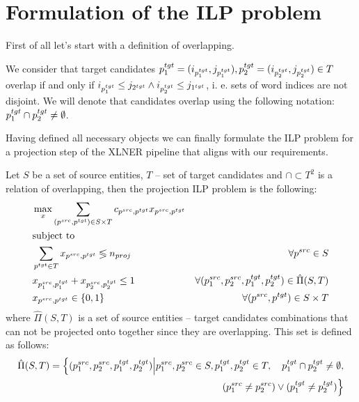 \section{Formulation of the ILP problem}
First of all let's start with a definition of overlapping.

\begin{definition} \label{def:overlapping}
    We consider that target candidates \linebreak
    \( p_1^{tgt} = (i_{p_1^{tgt}}, j_{p_1^{tgt}}), p_2^{tgt} = (i_{p_2^{tgt}}, j_{p_2^{tgt}}) \in T \) overlap if and only if
    \( i_{p_1^{tgt}} \leq j_{2^{tgt}} \land i_{p_2^{tgt}} \leq j_{1^{tgt}} \), i. e. sets of word indices are
    not disjoint. We will denote that candidates overlap using
    the following notation: \( p_1^{tgt} \cap p_2^{tgt} \neq \emptyset \).
\end{definition}

Having defined all necessary objects we can finally formulate the ILP problem for a
projection step of the XLNER pipeline that aligns with our requirements.

Let \( S \) be a set of source entities, \( T \) -- set of target candidates and \( \cap \subset T^2 \) is
a relation of overlapping, then the projection ILP problem is the following:
\begin{align}
    \label{eq:objective}
     & \max\limits_x \sum\limits_{(p^{src}, p^{tgt}) \in S \times T} c_{p^{src}, p^{tgt}} x_{p^{src}, p^{tgt}}                                             \\
     & \text{subject to} \notag                                                                                                                            \\
    \label{eq:num_proj_const}
     & \sum\limits_{p^{tgt} \in T} x_{p^{src}, p^{tgt}} \lessgtr n_{proj}                                      & \forall p^{src} \in S                     \\
    \label{eq:non_overlap_const}
     & x_{p_1^{src}, p_1^{tgt}} + x_{p_2^{src}, p_2^{tgt}} \leq 1
     & \forall (p_1^{src}, p_2^{src}, p_1^{tgt}, p_2^{tgt}) \in \hat{\Pi}(S, T)                                                                            \\
    \label{eq:binary_prog}
     & x_{p^{src}, p^{tgt}} \in \{ 0, 1 \}                                                                     & \forall (p^{src}, p^{tgt}) \in S \times T
\end{align}
where \( \hat{\Pi}(S, T) \) is a set of source entities -- target candidates combinations that can not be
projected onto together since they are overlapping. This set is defined as follows:
\begin{equation}  \label{eq:overlapping_set}
    \begin{aligned}
        \hat{\Pi}(S, T) = \Big\{ (p_1^{src}, p_2^{src}, p_1^{tgt}, p_2^{tgt}) \Big| p_1^{src}, p_2^{src} \in S, p_1^{tgt}, p_2^{tgt} \in T, \quad p_1^{tgt} \cap p_2^{tgt} \neq \emptyset, \\
        (p_1^{src} \neq p_2^{src}) \lor (p_1^{tgt} \neq p_2^{tgt}) \Big\}
    \end{aligned}
\end{equation}

